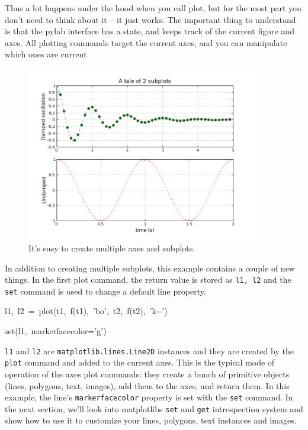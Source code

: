 Thus a lot happens under the hood when you call plot, but for the
most part you don't need to think about it -- it just works. The important
thing to understand is that the pylab interface has a state, and keeps
track of the current figure and axes. All plotting commands target
the current axes, and you can manipulate which ones are current



%
\begin{figure}
\begin{centering}
\includegraphics[width=4in]{fig/mpl_subplot_demo}
\par\end{centering}

\caption{\label{fig:mpl_subplot}It's easy to create multiple axes and subplots.}

\end{figure}


In addition to creating multiple subplots, this example contains a
couple of new things. In the first plot command, the return value
is stored as \texttt{l1, l2} and the \texttt{set} command is used
to change a default line property. 

\begin{lyxcode}
l1,~l2~=~plot(t1,~f(t1),~'bo',~t2,~f(t2),~'k-{}-')

set(l1,~markerfacecolor='g')
\end{lyxcode}
\texttt{l1} and \texttt{l2} are \texttt{matplotlib.lines.Line2D} instances
and they are created by the \texttt{plot} command and added to the
current axes. This is the typical mode of operation of the axes plot
commands: they create a bunch of primitive objects (lines, polygons,
text, images), add them to the axes, and return them. In this example,
the line's \texttt{markerfacecolor} property is set with the \texttt{set}
command. In the next section, we'll look into matplotlibs \texttt{set}
and \texttt{get} introspection system and show how to use it to customize
your lines, polygons, text instances and images.


